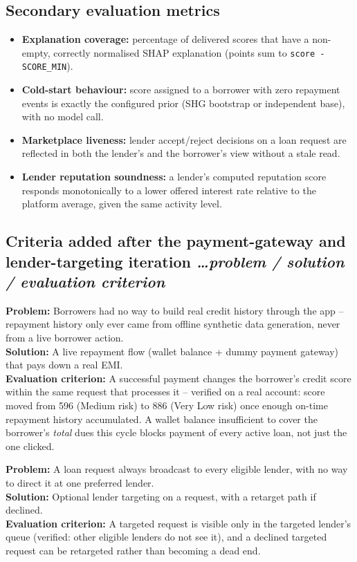 \documentclass[11pt,a4paper]{article}
\newcommand{\BvrHint}[1]{%
  {\normalfont\normalsize\itshape\hfill #1}}
\begin{document}
\subsection{Secondary evaluation metrics}
\begin{itemize}[leftmargin=0.7cm]
    \item \textbf{Explanation coverage:} percentage of
    delivered scores that have a non-empty, correctly
    normalised SHAP explanation (points sum to
    \texttt{score - SCORE\_MIN}).
    \item \textbf{Cold-start behaviour:} score assigned to
    a borrower with zero repayment events is exactly the
    configured prior (SHG bootstrap or independent base),
    with no model call.
    \item \textbf{Marketplace liveness:} lender
    accept/reject decisions on a loan request are reflected
    in both the lender's and the borrower's view without a
    stale read.
    \item \textbf{Lender reputation soundness:} a lender's
    computed reputation score responds monotonically to a
    lower offered interest rate relative to the platform
    average, given the same activity level.
\end{itemize}

\subsection{Criteria added after the payment-gateway and
lender-targeting iteration %
\BvrHint{\ldots problem / solution / evaluation criterion}}

\textbf{Problem:} Borrowers had no way to build real credit
history through the app -- repayment history only ever came
from offline synthetic data generation, never from a live
borrower action.\\
\textbf{Solution:} A live repayment flow (wallet balance +
dummy payment gateway) that pays down a real EMI.\\
\textbf{Evaluation criterion:} A successful payment changes
the borrower's credit score within the same request that
processes it -- verified on a real account: score moved
from 596 (Medium risk) to 886 (Very Low risk) once enough
on-time repayment history accumulated. A wallet balance
insufficient to cover the borrower's \emph{total} dues this
cycle blocks payment of every active loan, not just the one
clicked.

\medskip
\textbf{Problem:} A loan request always broadcast to every
eligible lender, with no way to direct it at one preferred
lender.\\
\textbf{Solution:} Optional lender targeting on a request,
with a retarget path if declined.\\
\textbf{Evaluation criterion:} A targeted request is visible
only in the targeted lender's queue (verified: other
eligible lenders do not see it), and a declined targeted
request can be retargeted rather than becoming a dead end.
\end{document}
